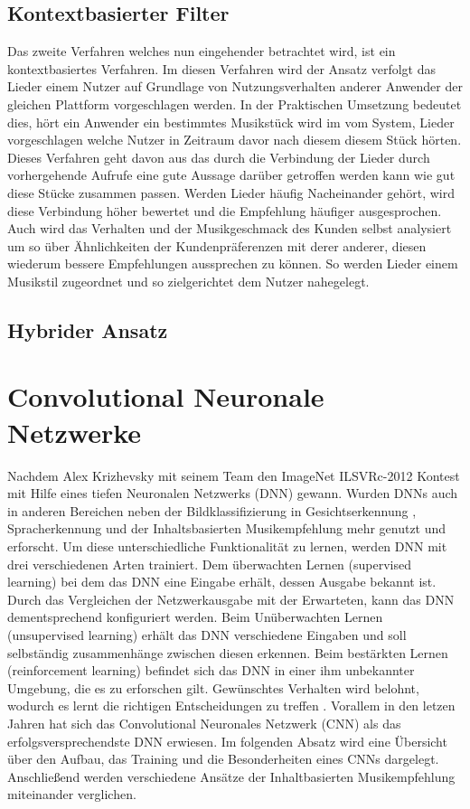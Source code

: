 \documentclass[twosided,a4,10pt]{article}
\begin{document}
\begin{multicols}{2}
\subsection{Kontextbasierter Filter}
Das zweite Verfahren welches nun eingehender betrachtet wird, ist ein kontextbasiertes Verfahren. Im diesen Verfahren wird der Ansatz verfolgt das Lieder einem Nutzer auf Grundlage von Nutzungsverhalten anderer Anwender der gleichen Plattform vorgeschlagen werden. In der Praktischen Umsetzung bedeutet dies, hört ein Anwender ein bestimmtes Musikstück wird im vom System, Lieder vorgeschlagen welche Nutzer in Zeitraum davor nach diesem diesem Stück hörten. Dieses Verfahren geht davon aus das durch die Verbindung der Lieder durch vorhergehende Aufrufe eine gute Aussage darüber getroffen werden kann wie gut diese Stücke zusammen passen. Werden Lieder häufig Nacheinander gehört, wird diese Verbindung höher bewertet und die Empfehlung häufiger ausgesprochen. Auch wird das Verhalten und der Musikgeschmack des Kunden selbst analysiert um so über Ähnlichkeiten der Kundenpräferenzen mit derer anderer, diesen wiederum bessere Empfehlungen aussprechen zu können. So werden Lieder einem Musikstil zugeordnet und so zielgerichtet dem Nutzer nahegelegt.
\subsection{Hybrider Ansatz}

\section{Convolutional Neuronale Netzwerke}
Nachdem Alex Krizhevsky mit seinem Team den ImageNet ILSVRc-2012 Kontest mit Hilfe eines tiefen Neuronalen Netzwerks (DNN) gewann. Wurden DNNs auch in anderen Bereichen neben der Bildklassifizierung \cite{alex}  in Gesichtserkennung \cite{ding}, Spracherkennung \cite{graves} und der Inhaltsbasierten Musikempfehlung \cite{oord} mehr genutzt und erforscht.\newline
Um diese unterschiedliche Funktionalität zu lernen, werden DNN mit drei verschiedenen Arten trainiert. Dem überwachten Lernen (supervised learning) bei dem das DNN eine Eingabe erhält, dessen Ausgabe bekannt ist. Durch das Vergleichen der Netzwerkausgabe mit der Erwarteten, kann das DNN dementsprechend konfiguriert werden. Beim Unüberwachten Lernen (unsupervised learning) erhält das DNN verschiedene Eingaben und soll selbständig zusammenhänge zwischen diesen erkennen. Beim bestärkten Lernen (reinforcement learning) befindet sich das DNN in einer ihm unbekannter Umgebung, die es zu erforschen gilt. Gewünschtes Verhalten wird belohnt, wodurch es lernt die richtigen Entscheidungen zu treffen \cite{wang2}.\newline 
Vorallem in den letzen Jahren hat sich das Convolutional Neuronales Netzwerk (CNN) als das erfolgsversprechendste DNN erwiesen.\newline 
Im folgenden Absatz wird eine Übersicht über den Aufbau, das Training und die Besonderheiten eines CNNs dargelegt. Anschließend werden verschiedene Ansätze der Inhaltbasierten Musikempfehlung miteinander verglichen.


\end{multicols}
\end{document}
